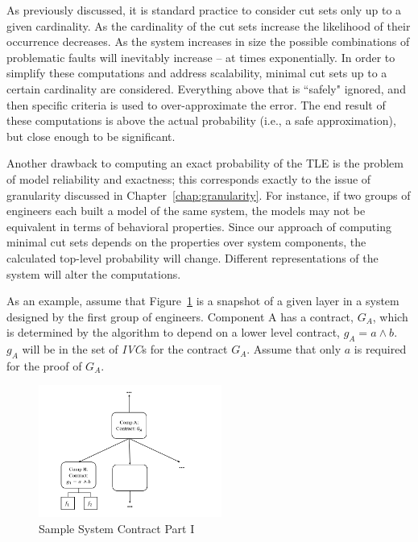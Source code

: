 As previously discussed, it is standard practice to consider cut sets only up to a given cardinality. As the cardinality of the cut sets increase the likelihood of their occurrence decreases. As the system increases in size the possible combinations of problematic faults will inevitably increase -- at times exponentially. In order to simplify these computations and address scalability, minimal cut sets up to a certain cardinality are considered. Everything above that is ``safely" ignored, and then specific criteria is used to over-approximate the error. The end result of these computations is above the actual probability (i.e., a safe approximation), but close enough to be significant. 

Another drawback to computing an exact probability of the TLE is the problem of model reliability and exactness; this corresponds exactly to the issue of granularity discussed in Chapter~\ref{chap:granularity}. For instance, if two groups of engineers each built a model of the same system, the models may not be equivalent in terms of behavioral properties. Since our approach of computing minimal cut sets depends on the properties over system components, the calculated top-level probability will change. Different representations of the system will alter the computations.  

As an example, assume that Figure~\ref{fig:probComp1} is a snapshot of a given layer in a system designed by the first group of engineers. Component A has a contract, $G_A$, which is determined by the \aivcalg algorithm to depend on a lower level contract, $g_A = a \land b$. $g_A$ will be in the set of \textit{IVC}s for the contract $G_A$. Assume that only $a$ is required for the proof of $G_A$. 

\begin{figure}[h]
\begin{center}
\includegraphics[width=6cm]{images/probComp1.PNG}
\caption{Sample System Contract Part I} \label{fig:probComp1}
\end{center}
\end{figure}

